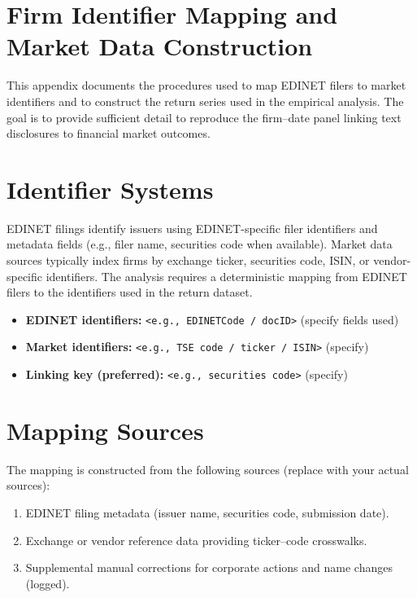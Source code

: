 \section{Firm Identifier Mapping and Market Data Construction}
\label{appendix:market_mapping}

This appendix documents the procedures used to map EDINET filers to market identifiers and to construct the return series used in the empirical analysis. The goal is to provide sufficient detail to reproduce the firm--date panel linking text disclosures to financial market outcomes.

\section{Identifier Systems}
\label{appendix:identifier_systems}

EDINET filings identify issuers using EDINET-specific filer identifiers and metadata fields (e.g., filer name, securities code when available). Market data sources typically index firms by exchange ticker, securities code, ISIN, or vendor-specific identifiers. The analysis requires a deterministic mapping from EDINET filers to the identifiers used in the return dataset.

\begin{itemize}
  \item \textbf{EDINET identifiers:} \texttt{<e.g., EDINETCode / docID>} (specify fields used)
  \item \textbf{Market identifiers:} \texttt{<e.g., TSE code / ticker / ISIN>} (specify)
  \item \textbf{Linking key (preferred):} \texttt{<e.g., securities code>} (specify)
\end{itemize}

\section{Mapping Sources}
\label{appendix:mapping_sources}

The mapping is constructed from the following sources (replace with your actual sources):

\begin{enumerate}
  \item EDINET filing metadata (issuer name, securities code, submission date).
  \item Exchange or vendor reference data providing ticker--code crosswalks.
  \item Supplemental manual corrections for corporate actions and name changes (logged).
\end{enumerate}

